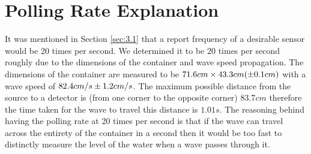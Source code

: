 \section{Polling Rate Explanation}
\label{app:B}

It was mentioned in Section \ref{sec:3.1} that a report frequency of a desirable sensor would be 20 times per second. We determined it to be 20 times per second roughly due to the dimensions of the container and wave speed propagation. The dimensions of the container are measured to be $71.6 cm \space \times \space 43.3 cm  \space (\pm 0.1cm)$ with a wave speed of $82.4cm/s \space \pm 1.2cm/s$. The maximum possible distance from the source to a detector is  (from one corner to the opposite corner) $83.7cm$ therefore the time taken for the wave to travel this distance is $1.01s$. The reasoning behind having the polling rate at 20 times per second is that if the wave can travel across the entirety of the container in a second then it would be too fast to distinctly measure the level of the water when a wave passes through it.